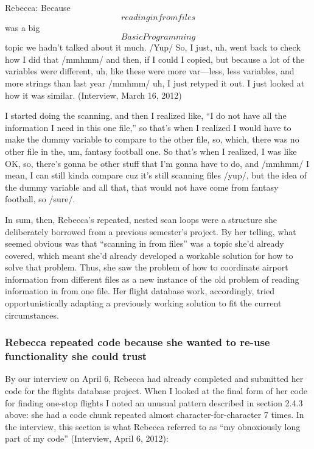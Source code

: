Rebecca: Because \[reading in from files\] was a big \[Basic Programming\] topic we hadn't talked about it much. /Yup/ So, I just, uh, went back to check how I did that /mmhmm/ and then, if I could I copied, but because a lot of the variables were different, uh, like these were more var---less, less variables, and more strings than last year /mmhmm/ uh, I just retyped it out. I just looked at how it was similar. (Interview, March 16, 2012)

I started doing the scanning, and then I realized like, ``I do not have all the information I need in this one file,'' so that's when I realized I would have to make the dummy variable to compare to the other file, so, which, there was no other file in the, um, fantasy football one. So that's when I realized, I was like OK, so, there's gonna be other stuff that I'm gonna have to do, and /mmhmm/ I mean, I can still kinda compare cuz it's still scanning files /yup/, but the idea of the dummy variable and all that, that would not have come from fantasy football, so /sure/.

In sum, then, Rebecca's repeated, nested scan loops were a structure she deliberately borrowed from a previous semester's project. By her telling, what seemed obvious was that ``scanning in from files'' was a topic she'd already covered, which meant she'd already developed a workable solution for how to solve that problem. Thus, she saw the problem of how to coordinate airport information from different files as a new instance of the old problem of reading information in from one file. Her flight database work, accordingly, tried opportunistically adapting a previously working solution to fit the current circumstances.

\subsubsection{Rebecca repeated code because she wanted to re-use functionality she could trust}\label{rebecca-repeated-code-because-she-wanted-to-re-use-functionality-she-could-trust}

By our interview on April 6, Rebecca had already completed and submitted her code for the flights database project. When I looked at the final form of her code for finding one-stop flights I noted an unusual pattern described in section 2.4.3 above: she had a code chunk repeated almost character-for-character 7 times. In the interview, this section is what Rebecca referred to as ``my obnoxiously long part of my code'' (Interview, April 6, 2012):

